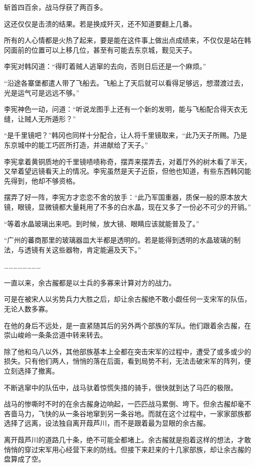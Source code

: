 斩首四百余，战马俘获了两百多。

这还仅仅是击溃的结果。若是换成歼灭，还不知道要翻上几番。

所有的人心情都是火热了起来，要是能在这件事上做出点成绩来，不仅仅是站在韩冈面前的位置可以上移几位，甚至有可能去东京城，觐见天子。

李宪对韩冈道：“得盯着贼人逃窜的去向，否则日后还是一个麻烦。”

“沿途各寨堡都遣人带了飞船去。飞船上了天后就可以看得足够远，想潜渡过去，光是运气可是远远不够。”

李宪神色一动，问道：“听说龙图手上还有一个新的发明，能与飞船配合得天衣无缝，让贼人无所遁形？”

“是千里镜吧？”韩冈也同样十分配合，让人将千里镜取来，“此乃天子所赐。乃是东京城中的能工巧匠所打造，并进献给了天子。”

李宪拿着黄铜质地的千里镜啧啧称奇，摆弄来摆弄去，对着厅外的树木看了半天，又举着望远镜看天上的情况。李宪虽然是天子近臣，但他也知道，有些东西韩冈能先得到，他却不够资格。

摆弄了好一阵，李宪方才恋恋不舍的放手：“此乃军国重器，质保一般的原本放大镜，眼镜，显微镜都大量耗用了不多的白水晶，现在又多了一份必不可少的开销。”

“等着水晶玻璃出来吧。到时候，放大镜、眼睛应该就能普及了。”

“广州的蕃商那里的玻璃器皿大半都是透明的。若是能得到透明的水晶玻璃的制法，与透镜有关这些器物，肯定能遍及天下。”

……………………

一直以来，余古赧都是以士兵的多寡来计算对方的战力。

可是在被宋人以劣势兵力大胜之后，却让余古赧绝不敢小觑任何一支宋军的队伍，无论人数多寡。

在他的身后不远处，是一直紧随其后的另外两个部族的军队。他们跟着余古赧，在崇山峻岭一条条岔道中转来转去。

除了他和乌八以外，其他部族基本上全都在突击宋军的过程中，遭受了或多或少的损失。只有他们两人，悄悄的落在后面，看到局势不利，无法击破宋军的阵列，便立刻选择了撤离。

不断逃窜中的队伍中，战马驮着惊慌失措的骑手，很快就到达了马匹的极限。

战马的惨嘶时不时的在余古赧身边响起，一匹匹战马累倒、垮下。但余古赧却毫不吝啬马力，飞快的从一条谷地窜到另一条谷地。而就在这个过程中，一家家部族都选择了远离，设法独自离开葭芦川，而不是跟着最为显眼的余古赧。

离开葭芦川的道路几十条，绝不可能全都堵上。余古赧就是抱着这样的想法，才敢悄悄的穿过宋军用心经营下来的防线。但接下来赶来的十几家部族，却让余古赧的盘算成了空。

